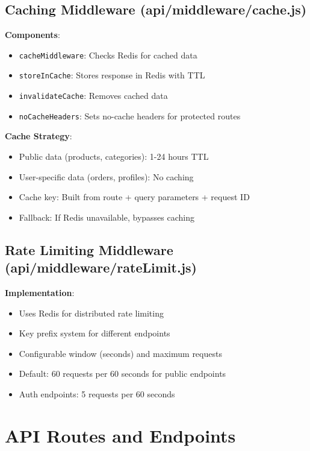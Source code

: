 \documentclass[12pt,a4paper]{report}
\begin{document}
\subsection{Caching Middleware (api/middleware/cache.js)}

\textbf{Components}:
\begin{itemize}
    \item \texttt{cacheMiddleware}: Checks Redis for cached data
    \item \texttt{storeInCache}: Stores response in Redis with TTL
    \item \texttt{invalidateCache}: Removes cached data
    \item \texttt{noCacheHeaders}: Sets no-cache headers for protected routes
\end{itemize}

\textbf{Cache Strategy}:
\begin{itemize}
    \item Public data (products, categories): 1-24 hours TTL
    \item User-specific data (orders, profiles): No caching
    \item Cache key: Built from route + query parameters + request ID
    \item Fallback: If Redis unavailable, bypasses caching
\end{itemize}

\subsection{Rate Limiting Middleware (api/middleware/rateLimit.js)}

\textbf{Implementation}:
\begin{itemize}
    \item Uses Redis for distributed rate limiting
    \item Key prefix system for different endpoints
    \item Configurable window (seconds) and maximum requests
    \item Default: 60 requests per 60 seconds for public endpoints
    \item Auth endpoints: 5 requests per 60 seconds
\end{itemize}

\section{API Routes and Endpoints}
\end{document}
